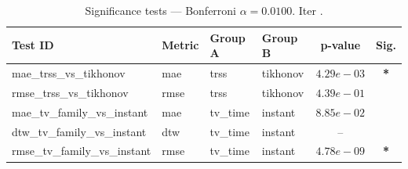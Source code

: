 ﻿%
\begin{table}[ht]
\centering
\caption[EEG reconstruction - Iteration it12]{Significance tests — Bonferroni $\alpha=0.0100$. Iter .}
\label{tab:sig_it12_vknng_knng_3syn}
\small
\begin{tabular}{llllcc}
\toprule
Test ID & Metric & Group A & Group B & p-value & Sig. \\
\midrule
mae\_trss\_vs\_tikhonov & mae & trss & tikhonov & $4.29e-03$ & \textbf{*} \\
rmse\_trss\_vs\_tikhonov & rmse & trss & tikhonov & $4.39e-01$ &  \\
mae\_tv\_family\_vs\_instant & mae & tv\_time & instant & $8.85e-02$ &  \\
dtw\_tv\_family\_vs\_instant & dtw & tv\_time & instant & -- &  \\
rmse\_tv\_family\_vs\_instant & rmse & tv\_time & instant & $4.78e-09$ & \textbf{*} \\
\bottomrule
\end{tabular}
\end{table}







